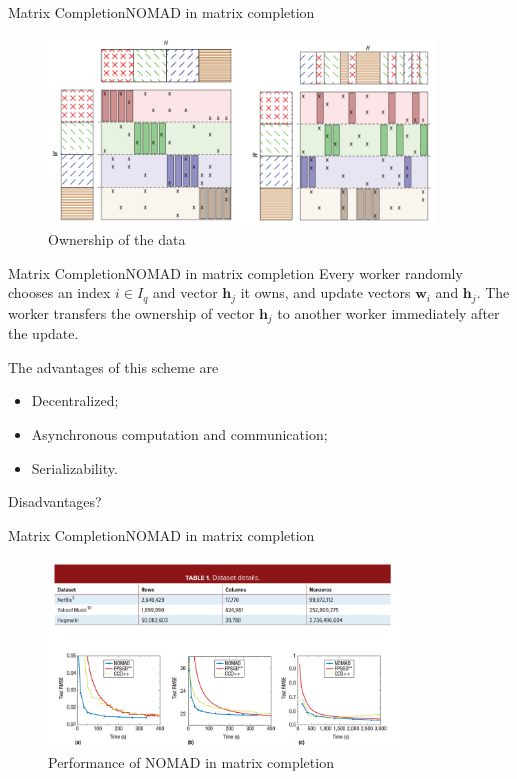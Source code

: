 \documentclass{beamer}
\renewcommand{\vec}{\mathbf}
\begin{document}
  \begin{frame}{Matrix Completion}{NOMAD in matrix completion}
    \begin{figure}
      \includegraphics[height = 5cm]{mc_data.png}
      \caption{Ownership of the data}
    \end{figure}
  \end{frame}

  \begin{frame}{Matrix Completion}{NOMAD in matrix completion}
    Every worker randomly chooses an index $i \in I_q$ and vector $\vec{h}_j$ it owns, and update vectors $\vec{w}_i$ and $\vec{h}_j$. The worker transfers the ownership of vector $\vec{h}_j$ to another worker immediately after the update. \par
    \pause
    The advantages of this scheme are
    \begin{itemize}
      \item Decentralized;
      \item Asynchronous computation and communication;
      \item Serializability.
    \end{itemize}
    \pause
    Disadvantages?
  \end{frame}

  \begin{frame}{Matrix Completion}{NOMAD in matrix completion}
    \begin{figure}
      \includegraphics[height = 5cm]{mc_perform.png}
      \caption{Performance of NOMAD in matrix completion}
    \end{figure}
  \end{frame}
\end{document}
